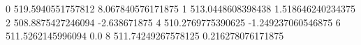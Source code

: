 0 519.5940551757812 8.067840576171875
1 513.0448608398438 1.518646240234375
2 508.8875427246094 -2.638671875
4 510.2769775390625 -1.249237060546875
6 511.5262145996094 0.0
8 511.74249267578125 0.216278076171875
